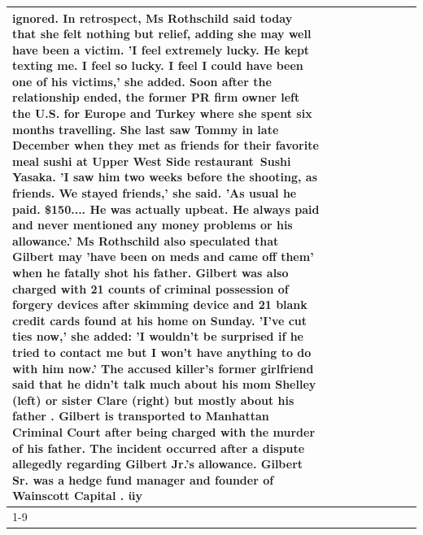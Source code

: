 \begin{table}[H]
\begin{tabular}{lllrlllll}
ignored. In retrospect, Ms Rothschild said today that she felt nothing but relief, adding she may well have been a victim. 'I feel extremely lucky. He kept texting me. I feel so lucky. I feel I could have been one of his victims,' she added. Soon after the relationship ended, the former PR firm owner left the U.S. for Europe and Turkey where she spent six months  travelling. She last saw Tommy in late December when they met as friends for their favorite meal sushi at Upper West Side restaurant Sushi Yasaka. 'I saw him two weeks before the shooting, as friends. We stayed friends,' she said. 'As usual he paid. \$150.... He was actually upbeat. He always paid and never mentioned any money problems or his allowance.' Ms Rothschild also speculated that Gilbert may 'have been on meds and came off them' when he fatally shot his father. Gilbert was also charged with 21 counts of criminal possession of forgery devices after skimming device and 21 blank credit cards found at his home on Sunday. 'I've cut ties now,' she added: 'I wouldn’t be surprised if he tried to contact me but I won’t have anything to do with him now.' The accused killer's former girlfriend said that he didn't talk much about his mom Shelley (left) or sister Clare (right) but mostly about his father . Gilbert is transported to Manhattan Criminal Court  after being charged with the murder of his father. The incident occurred after a dispute allegedly regarding Gilbert Jr.'s allowance. Gilbert Sr. was a hedge fund manager and founder of Wainscott Capital . üy \\
\cline{1-9}

\end{tabular}
\end{table}
